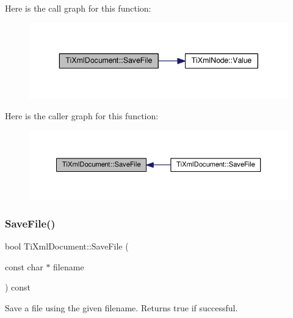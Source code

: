 Here is the call graph for this function\+:\nopagebreak
\begin{figure}[H]
\begin{center}
\leavevmode
\includegraphics[width=343pt]{class_ti_xml_document_ab63b96a6af5a467e289c7c75202edad9_cgraph}
\end{center}
\end{figure}
Here is the caller graph for this function\+:\nopagebreak
\begin{figure}[H]
\begin{center}
\leavevmode
\includegraphics[width=350pt]{class_ti_xml_document_ab63b96a6af5a467e289c7c75202edad9_icgraph}
\end{center}
\end{figure}
\mbox{\label{class_ti_xml_document_ae641f33784381017c44e107cc2c86b5c}} 
\subsubsection{\texorpdfstring{Save\+File()}{SaveFile()}\hspace{0.1cm}{\footnotesize\ttfamily [2/3]}}
{\footnotesize\ttfamily bool Ti\+Xml\+Document\+::\+Save\+File (\begin{DoxyParamCaption}\item[{const char $\ast$}]{filename }\end{DoxyParamCaption}) const}



Save a file using the given filename. Returns true if successful. 

